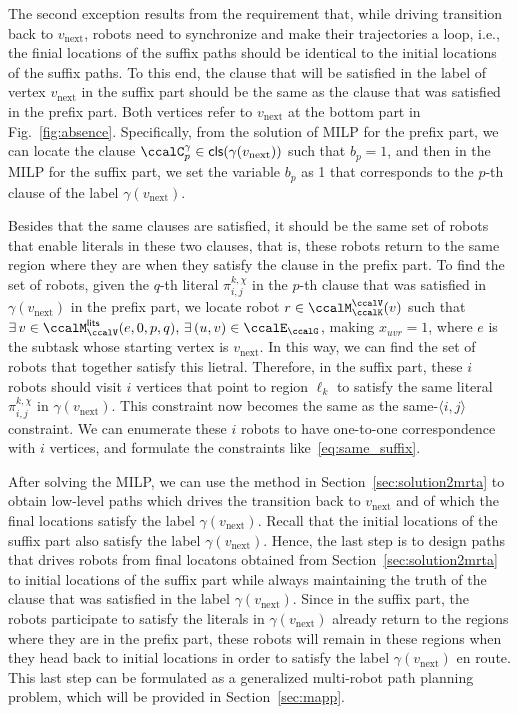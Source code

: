 \documentclass[Afour,sageh,times]{sagej}
\newcommand{\clause}[1]{\mathsf{cls}(#1)}
\newcommand{\ag}[2]{\langle#1,#2\rangle}
\renewcommand{\ap}[3]{\mathcal{\pi}_{{#1},{#2}}^{#3}}
\begin{document}
{  The second exception results from the requirement that, while driving transition back to $v_{\text{next}}$, robots need to synchronize and make their trajectories a loop, i.e., the finial locations of the suffix paths should be identical to the initial locations of the suffix paths. To this end, the clause that will be satisfied in the label of vertex $v_{\text{next}}$ in the suffix part should be the same as the clause that was satisfied in the prefix part. Both vertices refer to $v_{\text{next}}$ at the bottom part in Fig.~\ref{fig:absence}. Specifically, from the solution of MILP for the prefix part, we can locate the clause $\ccalC_p^\gamma \in \clause{\gamma(v_{\text{next}})}$ such that  $b_p = 1$, and then in the MILP for the suffix part, we set the variable $b_p$ as 1 that corresponds to the $p$-th clause of the label $\gamma(v_{\text{next}})$.

  Besides that the same clauses are satisfied, it should be the same set of robots that enable literals in these two clauses, that is, these robots return to the same region where they are when they satisfy the clause in the prefix part. To find the set of robots, given
  the $q$-th literal $\ap{i}{j}{k,\chi}$ in the $p$-th clause that was satisfied in $\gamma(v_{\text{next}})$ in the prefix part,  we locate robot $r\in \ccalM_\ccalK^\ccalV(v)$ such that $\exists\, v\in \ccalM_{\ccalV}^\mathsf{lits} (e, 0, p, q),\,\exists\, (u,v)\in\ccalE_\ccalG$, making $x_{uvr}=1$, where $e$ is the subtask whose starting vertex is $v_{\text{next}}$. In this way, we can find the set of robots that together satisfy this lietral. Therefore, in the suffix part, these $i$ robots should visit $i$ vertices that  point to region $\ell_k$ to satisfy the same literal $\ap{i}{j}{k,\chi}$ in $\gamma(v_{\text{next}})$. This constraint now becomes the same as the same-$\ag{i}{j}$ constraint. We can enumerate these $i$ robots to have one-to-one correspondence with $i$ vertices, and formulate the constraints like~\eqref{eq:same_suffix}.

After solving the MILP, we can use the method in Section~\ref{sec:solution2mrta} to obtain low-level paths which drives the transition back to $v_{\text{next}}$ and of which the final locations satisfy the label $\gamma(v_{\text{next}})$. Recall that the initial locations of the suffix part also satisfy the label $\gamma(v_{\text{next}})$. Hence, the last step is to design paths that drives robots from final locatons obtained from Section~\ref{sec:solution2mrta} to initial locations of the suffix part while always maintaining the truth of the  clause that was satisfied in the  label $\gamma(v_{\text{next}})$. Since in the suffix part, the robots participate to satisfy the literals in $\gamma(v_{\text{next}})$ already return to the regions where they are in the prefix part, these robots will remain in these regions when they head back to initial locations in order to satisfy the label $\gamma(v_{\text{next}})$ en route. This last step can be formulated as a generalized multi-robot path planning problem, which will be provided in Section~\ref{sec:mapp}.




}
\end{document}
